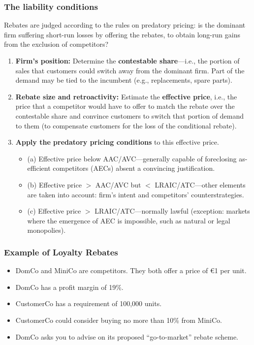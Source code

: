         \subsubsection{The liability conditions}

            Rebates are judged according to the rules on predatory pricing: is the dominant firm suffering short-run losses by offering the rebates, to obtain long-run gains from the exclusion of competitors?

            \begin{enumerate}
                \item \textbf{Firm’s position:} Determine the \textbf{contestable share}—i.e., the portion of sales that customers could switch away from the dominant firm. Part of the demand may be tied to the incumbent (e.g., replacements, spare parts).
                \item \textbf{Rebate size and retroactivity:} Estimate the \textbf{effective price}, i.e., the price that a competitor would have to offer to match the rebate over the contestable share and convince customers to switch that portion of demand to them (to compensate customers for the loss of the conditional rebate).
                \item \textbf{Apply the predatory pricing conditions} to this effective price.
                \begin{itemize}
                    \item (a) Effective price below AAC/AVC—generally capable of foreclosing as-efficient competitors (AECs) absent a convincing justification.
                    \item (b) Effective price \( > \) AAC/AVC but \( < \) LRAIC/ATC—other elements are taken into account: firm’s intent and competitors’ counterstrategies.
                    \item (c) Effective price \( > \) LRAIC/ATC—normally lawful (exception: markets where the emergence of AEC is impossible, such as natural or legal monopolies).
                \end{itemize}
            \end{enumerate}

        \subsubsection{Example of Loyalty Rebates}
            
            \begin{itemize}
                \item DomCo and MiniCo are competitors. They both offer a price of €1 per unit.
                \item DomCo has a profit margin of 19\%.
                \item CustomerCo has a requirement of 100,000 units.
                \item CustomerCo could consider buying no more than 10\% from MiniCo.
                \item DomCo asks you to advise on its proposed “go-to-market” rebate scheme.
            \end{itemize}

